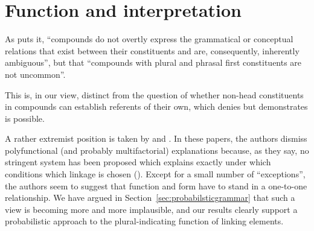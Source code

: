 \section{Function and interpretation}
\label{sec:functionandinterpretation}


As \parencite[365--366]{Olsen2015} puts it, ``compounds do not overtly express the grammatical or conceptual relations that exist between their constituents and are, consequently, inherently ambiguous'', but that ``compounds with plural and phrasal first constituents are not uncommon''.

This is, in our view, distinct from the question of whether non-head constituents in compounds can establish referents of their own, which \textcite[366]{Olsen2015} denies but \textcite{Dressler1987} demonstrates is possible.

A rather extremist position is taken by \textcite{NeefBorgwaldt2012} and \textcite{Neef2015}.
In these papers, the authors dismiss polyfunctional (and probably multifactorial) explanations because, as they say, no stringent system has been proposed which explains exactly under which conditions which linkage is chosen (\egg \citealt[27--29]{NeefBorgwaldt2012}).
Except for a small number of ``exceptions'', the authors seem to suggest that function and form have to stand in a one-to-one relationship.
We have argued in Section~\ref{sec:probabilsticgrammar} that such a view is becoming more and more implausible, and our results clearly support a probabilistic approach to the plural-indicating function of linking elements.


